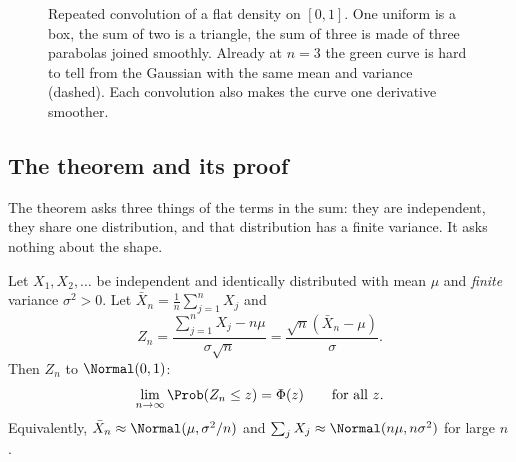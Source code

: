 \begin{figure}[htbp]
\centering
{}
\caption{Repeated convolution of a flat density on $[0,1]$. One uniform is a box, the sum of two is a triangle, the sum of three is made of three parabolas joined smoothly. Already at $n=3$ the green curve is hard to tell from the Gaussian with the same mean and variance (dashed). Each convolution also makes the curve one derivative smoother.}
\label{2b:fig:convolution}
\end{figure}

\subsection{The theorem and its proof}
\label{2b:sec:clt-proof}

The theorem asks three things of the terms in the sum: they are independent, they share one distribution, and that distribution has a finite variance. It asks nothing about the shape.

\begin{keyidea}
Let $X_1,X_2,\dots$ be independent and identically distributed with mean $\mu$ and \emph{finite} variance $\sigma^2>0$. Let $\bar X_n=\frac1n\sum_{j=1}^nX_j$ and
\begin{equation}
  Z_n=\frac{\sum_{j=1}^nX_j-n\mu}{\sigma\sqrt n}=\frac{\sqrt n(\bar X_n-\mu)}{\sigma} .
  \label{2b:eq:zn}
\end{equation}
Then $Z_n$   to $\Normal(0,1)$:
\begin{equation}
  \lim_{n\to\infty}\Prob(Z_n\le z)=\Phi(z)\qquad\text{for all }z .
  \label{2b:eq:clt}
\end{equation}
Equivalently, $\bar X_n\approx\Normal(\mu,\sigma^2/n)$ and $\sum_jX_j\approx\Normal(n\mu,n\sigma^2)$ for large $n$.
\end{keyidea}

